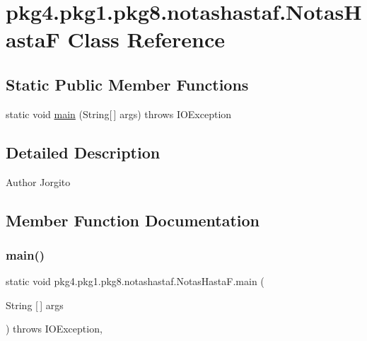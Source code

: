\hypertarget{classpkg4_1_1pkg1_1_1pkg8_1_1notashastaf_1_1_notas_hasta_f}{}\section{pkg4.\+pkg1.\+pkg8.\+notashastaf.\+Notas\+HastaF Class Reference}
\label{classpkg4_1_1pkg1_1_1pkg8_1_1notashastaf_1_1_notas_hasta_f}
\subsection*{Static Public Member Functions}
\begin{DoxyCompactItemize}
\item 
static void \mbox{\hyperlink{classpkg4_1_1pkg1_1_1pkg8_1_1notashastaf_1_1_notas_hasta_f_a2dc0baa2bedde162886ddaf05e54b38a}{main}} (String\mbox{[}$\,$\mbox{]} args)  throws I\+O\+Exception 
\end{DoxyCompactItemize}


\subsection{Detailed Description}
\begin{DoxyAuthor}{Author}
Jorgito 
\end{DoxyAuthor}


\subsection{Member Function Documentation}
\mbox{\label{classpkg4_1_1pkg1_1_1pkg8_1_1notashastaf_1_1_notas_hasta_f_a2dc0baa2bedde162886ddaf05e54b38a}} 
\subsubsection{\texorpdfstring{main()}{main()}}
{\footnotesize\ttfamily static void pkg4.\+pkg1.\+pkg8.\+notashastaf.\+Notas\+Hasta\+F.\+main (\begin{DoxyParamCaption}\item[{String \mbox{[}$\,$\mbox{]}}]{args }\end{DoxyParamCaption}) throws I\+O\+Exception\hspace{0.3cm}{\ttfamily [inline]}, {\ttfamily [static]}}


